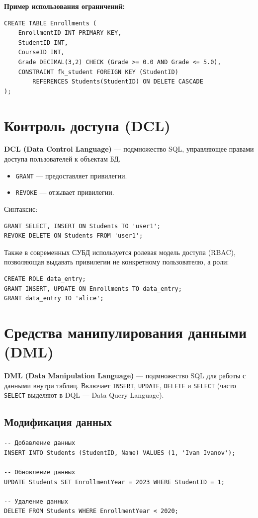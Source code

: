 \documentclass[12pt,a4paper]{article}
\begin{document}
\textbf{Пример использования ограничений:}
\begin{lstlisting}
CREATE TABLE Enrollments (
    EnrollmentID INT PRIMARY KEY,
    StudentID INT,
    CourseID INT,
    Grade DECIMAL(3,2) CHECK (Grade >= 0.0 AND Grade <= 5.0),
    CONSTRAINT fk_student FOREIGN KEY (StudentID)
        REFERENCES Students(StudentID) ON DELETE CASCADE
);
\end{lstlisting}

\section{Контроль доступа (DCL)}
\textbf{DCL (Data Control Language)} --- подмножество SQL, управляющее правами доступа пользователей к объектам БД.

\begin{itemize}
    \item \texttt{GRANT} --- предоставляет привилегии.
    \item \texttt{REVOKE} --- отзывает привилегии.
\end{itemize}

Синтаксис:
\begin{lstlisting}
GRANT SELECT, INSERT ON Students TO 'user1';
REVOKE DELETE ON Students FROM 'user1';
\end{lstlisting}

Также в современных СУБД используется ролевая модель доступа (RBAC), позволяющая выдавать привилегии не конкретному пользователю, а роли:
\begin{lstlisting}
CREATE ROLE data_entry;
GRANT INSERT, UPDATE ON Enrollments TO data_entry;
GRANT data_entry TO 'alice';
\end{lstlisting}

\section{Средства манипулирования данными (DML)}
\textbf{DML (Data Manipulation Language)} --- подмножество SQL для работы с данными внутри таблиц. Включает \texttt{INSERT}, \texttt{UPDATE}, \texttt{DELETE} и \texttt{SELECT} (часто \texttt{SELECT} выделяют в DQL --- Data Query Language).

\subsection{Модификация данных}
\begin{lstlisting}
-- Добавление данных
INSERT INTO Students (StudentID, Name) VALUES (1, 'Ivan Ivanov');

-- Обновление данных
UPDATE Students SET EnrollmentYear = 2023 WHERE StudentID = 1;

-- Удаление данных
DELETE FROM Students WHERE EnrollmentYear < 2020;
\end{lstlisting}
\end{document}
